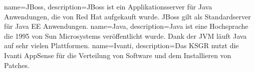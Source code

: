 
\makenoidxglossaries
{}
{
        name=JBoss,
        description={JBoss ist ein Applikationsserver für \Gls{Java} Anwendungen, die von Red Hat aufgekauft wurde.
        JBoss gilt als Standardserver für Java EE Anwendungen\cite{U4ZJDNI2}.}
}
{
        name=Java,
        description={Java ist eine Hochsprache die 1995 von Sun Microsystems veröffentlicht wurde.
Dank der JVM läuft Java auf sehr vielen Plattformen\cite{6H25Z3UI}.}
}
{
        name=Ivanti,
        description={Das KSGR nutzt die Ivanti AppSense\cite{LPHK6T9X, 8CHLH32N} für die Verteilung von Software und dem Installieren von Patches.}
}
